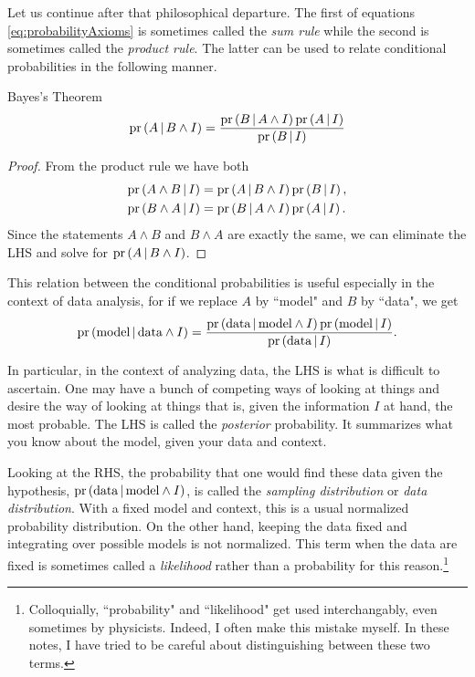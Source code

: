 Let us continue after that philosophical departure.
The first of equations 
\eqref{eq:probabilityAxioms} is sometimes called the {\it sum
rule} while the second is sometimes called the {\it product
rule}. The latter can be used to relate conditional probabilities
in the following manner.

\begin{theorem}{Bayes's Theorem}{} 
$$
\pr{A\given B\land I}=\frac{\pr{B\given A\land I}\pr{A\given I}}{\pr{B\given I}}
$$
  \begin{proof}
  From the product rule we have both
\begin{equation*}\begin{aligned}
\pr{A\wedge B\given I}&=\pr{A\given B\wedge I}\pr{B\given I},\\
\pr{B\wedge A\given I}&=\pr{B\given A\wedge I}\pr{A\given I}.
\end{aligned}\end{equation*}
  Since the statements $A\land B$ and $B\land A$ are exactly the same, we can
eliminate the LHS and solve for $\pr{A\given B\land I}$.
  \end{proof}
\end{theorem}

This relation between the conditional probabilities is useful especially in the
context of data analysis, for if we replace $A$ by ``model" and $B$ by ``data",
we get 
\begin{equation}\label{eq:modelDataBayes}
\pr{\text{model}\given \text{data}\land I}
=\frac{\pr{\text{data}\given \text{model}\land I}\pr{\text{model}\given I}}{\pr{\text{data}\given
I}}.
\end{equation}

In particular, in the context of analyzing data, the LHS is what is difficult to
ascertain. One may have a bunch of competing ways of looking at things and
desire the way of looking at things that is, given the information $I$ at hand,
the most probable. The LHS is called the {\it posterior}
probability. It summarizes what you know about the model, given your data
and context.

Looking at the RHS, the probability that one would find these data
given the hypothesis, $\pr{\text{data}\given\text{model}\land I}$, 
is called the {\it sampling distribution} 
or {\it data distribution}. With a fixed model and
context, this is a usual normalized probability distribution. On the other hand,
keeping the data fixed and integrating over possible models is not normalized.
This term when the data are fixed is sometimes called a
{\it likelihood} rather than a probability for this
reason.\footnote{Colloquially, ``probability" and ``likelihood" get used
interchangably, even sometimes by physicists. Indeed, I often make this mistake
myself. In these notes, I have tried to be careful about distinguishing between
these two terms.}


